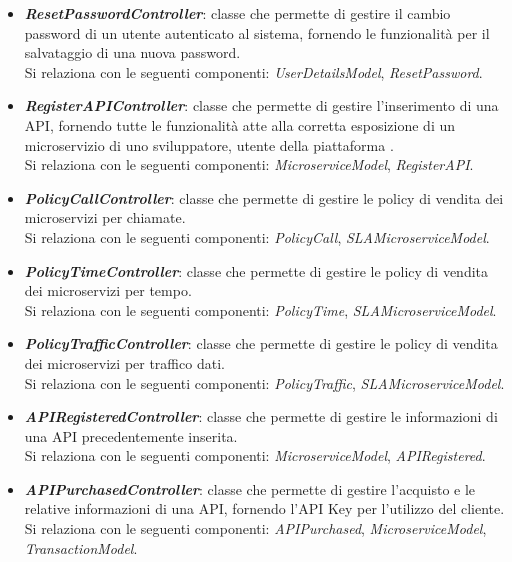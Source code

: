 \begin{itemize}
\begin{itemize}
		\item \textbf{\textit{ResetPasswordController}}: classe che permette di gestire il cambio password di un utente autenticato al sistema, fornendo le funzionalità per il salvataggio di una nuova password.\\
		Si relaziona con le seguenti componenti: \textit{UserDetailsModel}, \textit{ResetPassword}.
		
		\item \textbf{\textit{RegisterAPIController}}: classe che permette di gestire l'inserimento di una API, fornendo tutte le funzionalità atte alla corretta esposizione di un microservizio di uno sviluppatore, utente della piattaforma \progetto.\\
		Si relaziona con le seguenti componenti: \textit{MicroserviceModel}, \textit{RegisterAPI}.
				
		\item \textbf{\textit{PolicyCallController}}: classe che permette di gestire le policy di vendita dei microservizi per chiamate.\\
		Si relaziona con le seguenti componenti: \textit{PolicyCall}, \textit{SLAMicroserviceModel}.
		
		\item \textbf{\textit{PolicyTimeController}}: classe che permette di gestire le policy di vendita dei microservizi per tempo.\\
		Si relaziona con le seguenti componenti: \textit{PolicyTime}, \textit{SLAMicroserviceModel}.
		
		\item \textbf{\textit{PolicyTrafficController}}: classe che permette di gestire le policy di vendita dei microservizi per traffico dati.\\
		Si relaziona con le seguenti componenti: \textit{PolicyTraffic}, \textit{SLAMicroserviceModel}.
		
		\item \textbf{\textit{APIRegisteredController}}: classe che permette di gestire le informazioni di una API precedentemente inserita.\\
		Si relaziona con le seguenti componenti: \textit{MicroserviceModel}, \textit{APIRegistered}.
		
		\item \textbf{\textit{APIPurchasedController}}: classe che permette di gestire l'acquisto e le relative informazioni di una API, fornendo l'API Key per l'utilizzo del cliente.\\
		Si relaziona con le seguenti componenti: \textit{APIPurchased}, \textit{MicroserviceModel}, \textit{TransactionModel}.
		

\end{itemize}
\end{itemize}
